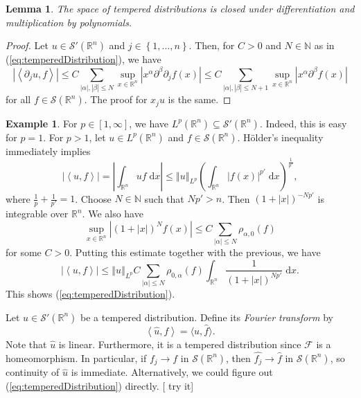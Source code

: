 \documentclass{book}
\newcommand{\scrF}{\mathscr{F}}
\newcommand{\scrS}{\mathscr{S}}
\newcommand{\bbN}{\mathbb{N}}
\newcommand{\bbR}{\mathbb{R}}
\renewcommand{\d}{\mathrm{d}}
\newcommand{\abs}[1]{\left\lvert {#1} \right\rvert}
\newcommand{\norm}[1]{\left\Vert {#1} \right\Vert}
\newcommand{\set}[1]{\left\{ {#1} \right\}}
\newcommand{\angles}[1]{\left\langle {#1} \right\rangle}
\newcommand{\fhangles}[1]{\langle {#1} \rangle}
\newcommand{\parens}[1]{\left( {#1} \right)}
\newtheorem{lemma}[theorem]{Lemma}
\theoremstyle{definition}
\newtheorem{example}[theorem]{Example}
\theoremstyle{remark}
\numberwithin{equation}{chapter}
\begin{document}
\begin{lemma}
    The space of tempered distributions is closed under differentiation and multiplication by polynomials.
\end{lemma}
\begin{proof}
    Let $u \in \scrS'(\bbR^n)$ and $j \in \set{1,\dots,n}$. Then, for $C > 0$ and $N \in \bbN$ as in (\ref{eq:temperedDistribution}), we have  
    \begin{equation}
        \abs{\angles{\partial_j u,f}} \leq C\sum_{\abs{\alpha},\abs{\beta} \leq N} \sup_{x \in \bbR^n} \abs{x^\alpha \partial^\beta \partial_j f(x)}
        \leq C\sum_{\abs{\alpha},\abs{\beta} \leq N+1} \sup_{x \in \bbR^n} \abs{x^\alpha \partial^\beta f(x)}
    \end{equation}
    for all $f \in \scrS(\bbR^n)$. The proof for $x_j u$ is the same.
\end{proof}

\begin{example} 
    For $p \in [1,\infty]$, we have $L^p(\bbR^n) \subseteq \scrS'(\bbR^n)$. Indeed, this is easy for $p = 1$. For $p > 1$, let $u \in L^p(\bbR^n)$ and $f \in \scrS(\bbR^n)$. H\"older's inequality immediately implies 
    \begin{equation}
        \abs{\angles{u,f}} = \abs{ \int_{\bbR^n} uf \; \d x } \leq \norm{u}_{L^p} \parens{ \int_{\bbR^n} \abs{f(x)}^{p'} \; \d x}^{\frac{1}{p'}},
    \end{equation}
    where $\frac{1}{p} + \frac{1}{p'} = 1$. Choose $N \in \bbN$ such that $Np' > n$. Then $(1+\abs{x})^{-Np'}$ is integrable over $\bbR^n$. We also have 
    \begin{equation}
        \sup_{x \in \bbR^n} \abs{(1+\abs{x})^N f(x)} \leq C \sum_{\abs{\alpha} \leq N} \rho_{\alpha,0}(f)
    \end{equation}
    for some $C > 0$. Putting this estimate together with the previous, we have 
    \begin{equation}
        \abs{\angles{u,f}} \leq \norm{u}_{L^p} C \sum_{\abs{\alpha} \leq N} \rho_{0,\alpha}(f) \int_{\bbR^n} \frac{1}{(1+\abs{x})^{Np'}} \; \d x.
    \end{equation}
    This shows (\ref{eq:temperedDistribution}).
\end{example}

Let $u \in \scrS'(\bbR^n)$ be a tempered distribution. Define its \textit{Fourier transform} by 
\begin{equation}
    \angles{\widehat{u},f} = \fhangles{u,\widehat{f}}.
\end{equation}
Note that $\widehat{u}$ is linear. Furthermore, it is a tempered distribution since $\scrF$ is a homeomorphism. In particular, if $f_j \rightarrow f$ in $\scrS(\bbR^n)$, then $\widehat{f_j} \rightarrow \widehat{f}$ in $\scrS(\bbR^n)$, so continuity of $\widehat{u}$ is immediate. Alternatively, we could figure out (\ref{eq:temperedDistribution}) directly. [{\color{red} try it}]
\end{document}
